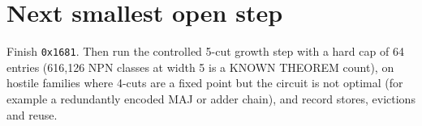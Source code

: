 \documentclass[11pt]{article}
\begin{document}
\section{Next smallest open step}
Finish \texttt{0x1681}. Then run the controlled 5-cut growth step with a hard cap of 64 entries (616{,}126 NPN classes at width 5 is a KNOWN THEOREM count), on hostile families where 4-cuts are a fixed point but the circuit is not optimal (for example a redundantly encoded MAJ or adder chain), and record stores, evictions and reuse.

\end{document}
